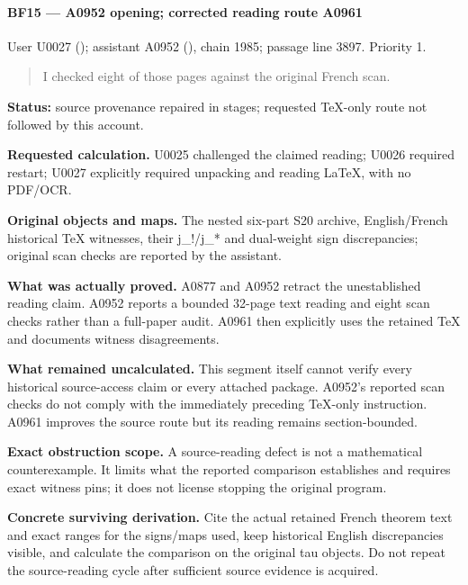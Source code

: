\paragraph{BF15 --- A0952 opening; corrected reading route
A0961}\label{bf15-a0952-opening-corrected-reading-route-a0961}

User U0027 (\protect{});
assistant A0952 (\protect{}),
chain 1985; passage line 3897. Priority 1.

\begin{quote}
I checked eight of those pages against the original French scan.
\end{quote}

\textbf{Status:} source provenance repaired in stages; requested
TeX-only route not followed by this account.

\textbf{Requested calculation.} U0025 challenged the claimed reading;
U0026 required restart; U0027 explicitly required unpacking and reading
LaTeX, with no PDF/OCR.

\textbf{Original objects and maps.} The nested six-part S20 archive,
English/French historical TeX witnesses, their j\_!/j\_* and dual-weight
sign discrepancies; original scan checks are reported by the assistant.

\textbf{What was actually proved.} A0877 and A0952 retract the
unestablished reading claim. A0952 reports a bounded 32-page text
reading and eight scan checks rather than a full-paper audit. A0961 then
explicitly uses the retained TeX and documents witness disagreements.

\textbf{What remained uncalculated.} This segment itself cannot verify
every historical source-access claim or every attached package. A0952's
reported scan checks do not comply with the immediately preceding
TeX-only instruction. A0961 improves the source route but its reading
remains section-bounded.

\textbf{Exact obstruction scope.} A source-reading defect is not a
mathematical counterexample. It limits what the reported comparison
establishes and requires exact witness pins; it does not license
stopping the original program.

\textbf{Concrete surviving derivation.} Cite the actual retained French
theorem text and exact ranges for the signs/maps used, keep historical
English discrepancies visible, and calculate the comparison on the
original tau objects. Do not repeat the source-reading cycle after
sufficient source evidence is acquired.

